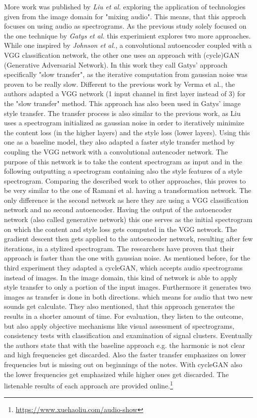 More work was published by \textit{Liu et al.} \cite{Liu2019} exploring the application of technologies given from the image domain for "mixing audio". This means, that this approch focuses on using audio as spectrograms. As the previous study solely focused on the one technique by \textit{Gatys et al.} this experimient explores two more approaches. While one inspired by \textit{Johnson et al.}, a convolutional autoencoder coupled with a VGG classification network, the other one uses an approach with (cycle)GAN (Generative Adversarial Network). In this work they call Gatys' approach specifically "slow transfer", as the iterative computation from gaussian noise was proven to be really slow. Different to the previous work by Verma et al., the authors adapted a VGG network (1 input channel in first layer instead of 3) for the "slow transfer" method. This approach has also been used in Gatys' image style transfer. The transfer process is also similar to the previous work, as Liu uses a spectrogram initialized as gaussian noise in order to iteratively minimize the content loss (in the higher layers) and the style loss (lower layers). Using this one as a baseline model, they also adapted a faster style transfer method by coupling the VGG network with a convolutional autencoder network. The purpose of this network is to take the content spectrogram as input and in the following outputting a spectrogram containing also the style features of a style spectrogram. Comparing the described work to other approaches, this proves to be very similar to the one of Ramani et al. having a transformation network. The only difference is the second network as here they are using a VGG classification network and no second autoencoder. Having the output of the autoencoder network (also called generative network) this one serves as the initial spectrogram on which the content and style loss gets computed in the VGG network. The gradient descent then gets applied to the autoencoder network, resulting after few iterations, in a stylized spectrogram. The researchers have proven that their approach is faster than the one with gaussian noise. As mentioned before, for the third experiment they adapted a cycleGAN, which accepts audio spectrograms instead of images. In the image domain, this kind of network is able to apply style transfer to only a portion of the input images. Furthermore it generates two images as transfer is done in both directions. which means for audio that two new sounds get calculate. They also mentioned, that this approach generates the results in a shorter amount of time. For evaluation, they listen to the outcome, but also apply objective mechanisms like visual assessment of spectrograms, consistency tests with classification and examination of signal clusters. Eventually the authors state that with the baseline approach e.g. the harmonic is not clear and high frequencies get discarded. Also the faster transfer emphasizes on lower frequencies but is missing out on beginnings of the notes. With cycleGAN also the lower frequencies get emphasized while higher ones get discarded. The listenable results of each approach are provided online.\footnote{\url{https://www.xuehaoliu.com/audio-show}}\\


